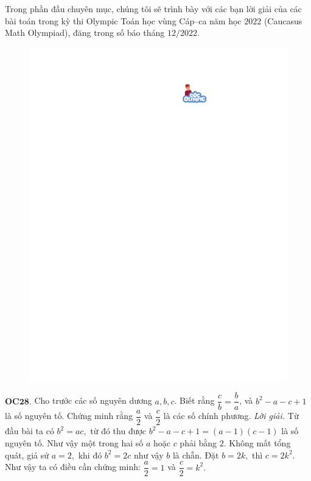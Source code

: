 \centering
\endgroup
\vspace*{5pt}

\begin{multicols}{2}
	Trong phần đầu chuyên mục, chúng tôi sẽ trình bày với các bạn lời giải của các bài toán trong kỳ thi Olympic Toán học vùng Cáp--ca năm học $2022$ (Caucasus Math Olympiad), đăng trong số báo tháng $12/2022$. 
	\begin{figure}[H]
		\vspace*{-5pt}
		\centering
		\captionsetup{labelformat= empty, justification=centering}
		\includegraphics[width= 1\linewidth]{gocolympic}
		\vspace*{-10pt}
	\end{figure}
	{\bf\color{cackithi} OC$\pmb{28.}$} Cho trước các số nguyên dương $a, b, c$. Biết rằng $\dfrac{c}{b} = \dfrac{b}{a}$, và $b^2 - a - c + 1$ là số nguyên tố. Chứng minh rằng $\dfrac{a}{2}$ và $\dfrac{c}{2}$ là các số chính phương.
	\vskip 0.1cm
	\textit{Lời giải.} Từ đầu bài ta có $b^2=ac,$ từ đó thu được  $b^2 - a - c + 1=(a-1)(c-1)$ là số nguyên tố. Như vậy một trong hai số $a$ hoặc $c$ phải bằng $2$. Không mất tổng quát, giả sử $a=2,$ khi đó $b^2=2c$ như vậy $b$ là chẵn. Đặt $b=2k,$ thì $c=2k^2.$ Như vậy ta có điều cần chứng minh: $\dfrac{a}{2}=1$ và $\dfrac{c}{2}=k^2.$

\end{multicols}
